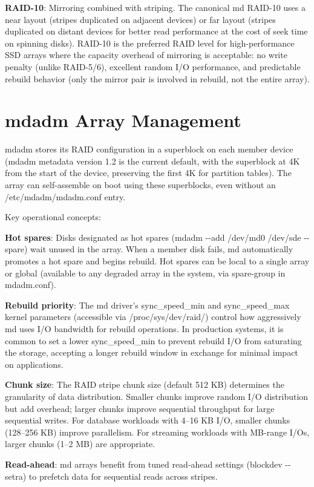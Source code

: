 \textbf{RAID-10}: Mirroring combined with striping. The canonical md RAID-10 uses a near layout (stripes duplicated on adjacent devices) or far layout (stripes duplicated on distant devices for better read performance at the cost of seek time on spinning disks). RAID-10 is the preferred RAID level for high-performance SSD arrays where the capacity overhead of mirroring is acceptable: no write penalty (unlike RAID-5/6), excellent random I/O performance, and predictable rebuild behavior (only the mirror pair is involved in rebuild, not the entire array).

\section{mdadm Array Management}
mdadm stores its RAID configuration in a superblock on each member device (mdadm metadata version 1.2 is the current default, with the superblock at 4K from the start of the device, preserving the first 4K for partition tables). The array can self-assemble on boot using these superblocks, even without an /etc/mdadm/mdadm.conf entry.

Key operational concepts:

\textbf{Hot spares}: Disks designated as hot spares (mdadm -\/-add /dev/md0 /dev/sde -\/-spare) wait unused in the array. When a member disk fails, md automatically promotes a hot spare and begins rebuild. Hot spares can be local to a single array or global (available to any degraded array in the system, via spare-group in mdadm.conf).

\textbf{Rebuild priority}: The md driver's sync\_speed\_min and sync\_speed\_max kernel parameters (accessible via /proc/sys/dev/raid/) control how aggressively md uses I/O bandwidth for rebuild operations. In production systems, it is common to set a lower sync\_speed\_min to prevent rebuild I/O from saturating the storage, accepting a longer rebuild window in exchange for minimal impact on applications.

\textbf{Chunk size}: The RAID stripe chunk size (default 512 KB) determines the granularity of data distribution. Smaller chunks improve random I/O distribution but add overhead; larger chunks improve sequential throughput for large sequential writes. For database workloads with 4--16 KB I/O, smaller chunks (128--256 KB) improve parallelism. For streaming workloads with MB-range I/Os, larger chunks (1--2 MB) are appropriate.

\textbf{Read-ahead}: md arrays benefit from tuned read-ahead settings (blockdev -\/-setra) to prefetch data for sequential reads across stripes.

